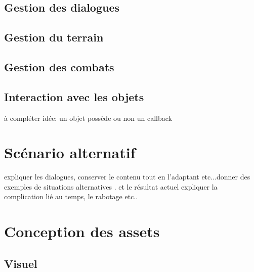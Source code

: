 \documentclass[11pt]{article}
\begin{document}
\subsection{Gestion des dialogues}
\subsection{Gestion du terrain}
\subsection{Gestion des combats}
\subsection{Interaction avec les objets}
à compléter idée: un objet possède ou non un callback 


\section{Scénario alternatif}
expliquer les dialogues, conserver le contenu tout en l'adaptant etc...donner des exemples de situations alternatives . et le résultat actuel
expliquer la complication lié au temps, le rabotage etc..
\section{Conception des assets}
\subsection{Visuel}
\end{document}
